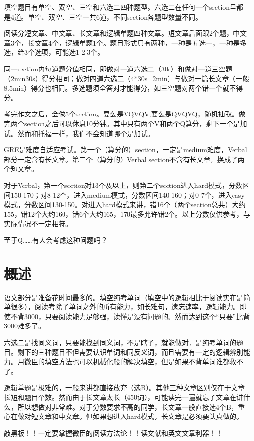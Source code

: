 \documentclass[cn,plain]{elegantbookex}
\begin{document}
填空题目有单空、双空、三空和六选二四种题型。六选二在任何一个section里都是4道。单空、双空、三空一共6道，不同section各题型数量不同。

阅读分短文章、中文章、长文章和逻辑单题四种文章。短文章后面跟2个题，中文章3个，长文章4个，逻辑单题1个。题目形式只有两种，一种是五选一，一种是多选，给3个选项，可能选1
2 3个。

同一section内每道题分值相同，即做对一道六选二（30s）和做对一道三空题（2min30s）得分相同；做对四道六选二（4*30s=2min）与做对一篇长文章（一般8.5min）得分也相同。多选题须全答对才能得分，如三空题对两个错一个就不得分。

考完作文之后，会做5个section。要么是VQVQV,要么是QVQVQ，随机抽取。做完两个section之后可以休息10分钟。其中只有两个V和两个Q算分，剩下一个是加试。然而和托福一样，我们不会知道哪个是加试。

GRE是难度自适应考试。第一个（算分的）section，一定是medium难度，Verbal部分一定含有长文章。第二个（算分的）Verbal
section不含有长文章，换成了两个短文章。

对于Verbal，第一个section对13个及以上，则第二个section进入hard模式，分数区间150-170；对8-12个，进入medium模式，分数区间140-160；对0-7个，进入easy模式，分数区间130-150。对进入hard模式来讲，错16个（两个section总共）大约155，错12个大约160，错6个大约165，170最多允许错2个。以上分数仅供参考，与实际情况不一定相符。

至于Q……有人会考虑这种问题吗？

\section{概述}
语文部分是准备花时间最多的。填空纯考单词（填空中的逻辑相比于阅读实在是简单很多），阅读考除了单词之外的所有能力，如长难句，遗忘速率，逻辑能力。即使不背3000，只要阅读能力足够强，读懂是没有问题的。然而达到这个``只要''比背3000难多了。

六选二是找同义词，只要能找到同义词，不是瞎子，就能做对，是纯考单词的题目。剩下的三种题目不但需要认识单词和同反义词，而且需要有一定的逻辑辨别能力。用微臣的填空方法也可以机械化般的解决填空，但是如果不背单词谁都救不了。

逻辑单题是极难的，一般来讲都直接放弃（选B）。其他三种文章区别仅在于文章长短和题目个数。然而由于长文章太长（450词），可能读完一遍就忘了文章在讲什么，所以想做对非常难。对于分数要求不高的同学，长文章一般直接选4个B，重心在做对短文章和中文章。但如果想进入hard模式，长文章是必须要认真做的。

敲黑板！！一定要掌握微臣的阅读方法论！！读文献和英文文章利器！！
\end{document}
